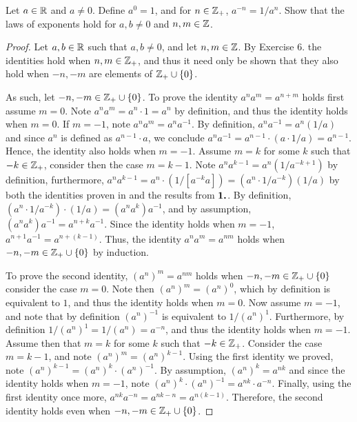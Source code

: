 \documentclass[12pt]{article}
\begin{document}
	 Let $a \in \mathbb{R}$ and $a \neq 0$. Define $a^0 = 1$, and for $n \in \mathbb{Z}_{+}$, $a^{-n} = 1/a^{n}$.
	Show that the laws of exponents hold for $a, b \neq 0$ and $n,m \in \mathbb{Z}$.
	\begin{proof}
		Let $a, b \in \mathbb{R}$ such that $a, b \neq 0$, and let $n, m \in \mathbb{Z}$. By Exercise 6. the identities
		hold when $n, m \in \mathbb{Z}_{+}$, and thus it need only be shown that they also hold when 
		$-n, -m$ are elements of $\mathbb{Z}_{+} \cup \{0\}$.
		
		As such, let $-n, -m \in \mathbb{Z}_{+} \cup \{0\}$. To prove the identity $a^na^m = a^{n + m}$ holds
		first assume $m = 0$. Note $a^na^m = a^n \cdot 1 = a^n$ by definition, and thus the 
		identity holds when $m = 0$. If $m = -1$, note $a^na^m = a^n a^{-1}$. By definition,
		$a^n a^{-1} = a^n (1/a)$ and since $a^n$ is defined as $a^{n - 1} \cdot a$,
		we conclude $a^na^{-1} = a^{n - 1} \cdot (a \cdot 1/a) = a^{n - 1}$. Hence, the 
		identity also holds when $m = -1$. Assume $m = k$ for some $k$ such that $-k \in \mathbb{Z}_{+}$,
		consider then the case $m = k - 1$. Note $a^na^{k - 1} = a^n (1/a^{-k + 1})$ by definition,
		furthermore, $a^n a^{k - 1} = a^n \cdot (1/[a^{-k}a]) = (a^n \cdot 1/a^{-k})(1/a)$ by both
		the identities proven in  and the results from $\exnumber{1.}$. By definition,
		$(a^n \cdot 1/a^{-k}) \cdot (1/a) = (a^n a^{k}) a^{-1}$, and by assumption, 
		$(a^n a^k) a^{-1} = a^{n + k} a^{-1}$. Since the identity holds when $m = -1$, 
		$a^{n + 1} a^{-1} = a^{n + (k - 1)}$. Thus, the identity $a^na^m = a^{nm}$ holds
		when $-n, -m \in \mathbb{Z}_{+}\cup\{0\}$ by induction.
		
		To prove the second identity, $(a^n)^m = a^{nm}$ holds when $-n, -m \in \mathbb{Z}_{+} \cup \{0\}$
		consider the case $m = 0$. Note then $(a^n)^m = (a^n)^0$, which by definition is equivalent
		to $1$, and thus the identity holds when $m = 0$. Now assume $m = -1$, and note that by definition
		$(a^n)^{-1}$ is equivalent to $1/(a^n)^1$. Furthermore, by definition 
		$1/(a^n)^1 = 1/(a^n) = a^{-n}$, and thus the identity holds when $m = -1$. Assume then 
		that $m = k$ for some $k$ such that $-k \in \mathbb{Z}_{+}$. Consider the case $m = k - 1$,
		and note $(a^n)^m = (a^n)^{k - 1}$. Using the first identity we proved, note
		$(a^n)^{k - 1} = (a^n)^k \cdot (a^n)^{-1}$. By assumption, $(a^n)^k = a^{nk}$ and since 
		the identity holds when $m = -1$, note $(a^n)^k \cdot (a^n)^{-1} = a^{nk} \cdot a^{-n}$. Finally,
		using the first identity once more, $a^{nk}a^{-n} = a^{nk - n} = a^{n(k - 1)}$. Therefore,
		the second identity holds even when $-n, -m \in \mathbb{Z}_{+} \cup \{0\}$.
		

\end{proof}
\end{document}

